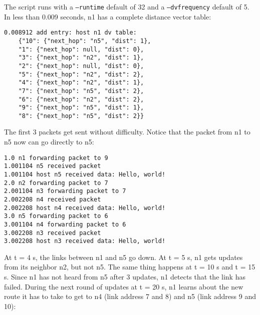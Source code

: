\documentclass[11pt]{article}
\newcommand{\code}[1]{\texttt{#1}}
\begin{document}
The script runs with a \code{--runtime} default of 32 and a \code{--dvfrequency} default of 5. In less than 0.009 seconds, n1 has a complete distance vector table:

\begin{lstlisting}
0.008912 add entry: host n1 dv table:
	{"10": {"next_hop": "n5", "dist": 1},
	"1": {"next_hop": null, "dist": 0},
	"3": {"next_hop": "n2", "dist": 1},
	"2": {"next_hop": null, "dist": 0},
	"5": {"next_hop": "n2", "dist": 2},
	"4": {"next_hop": "n2", "dist": 1},
	"7": {"next_hop": "n5", "dist": 2},
	"6": {"next_hop": "n2", "dist": 2},
	"9": {"next_hop": "n5", "dist": 1},
	"8": {"next_hop": "n5", "dist": 2}}
\end{lstlisting}

The first 3 packets get sent without difficulty. Notice that the packet from n1 to n5 now can go directly to n5:

\begin{lstlisting}
1.0 n1 forwarding packet to 9
1.001104 n5 received packet
1.001104 host n5 received data: Hello, world!
2.0 n2 forwarding packet to 7
2.001104 n3 forwarding packet to 7
2.002208 n4 received packet
2.002208 host n4 received data: Hello, world!
3.0 n5 forwarding packet to 6
3.001104 n4 forwarding packet to 6
3.002208 n3 received packet
3.002208 host n3 received data: Hello, world!
\end{lstlisting}

At t = 4 s, the links between n1 and n5 go down. At t = 5 s, n1 gets updates from its neighbor n2, but not n5. The same thing happens at t = 10 s and t = 15 s. Since n1 has not heard from n5 after 3 updates, n1 detects that the link has failed. During the next round of updates at t = 20 s, n1 learns about the new route it has to take to get to n4 (link address 7 and 8) and n5 (link address 9 and 10):
\end{document}
